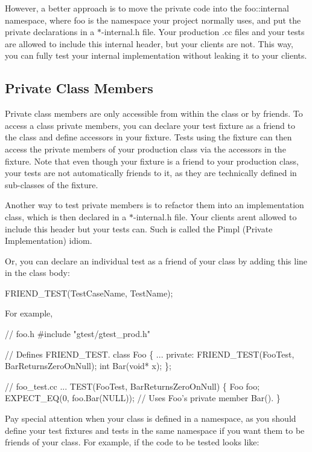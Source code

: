 However, a better approach is to move the private code into the {\ttfamily foo\+::internal} namespace, where {\ttfamily foo} is the namespace your project normally uses, and put the private declarations in a {\ttfamily $\ast$-\/internal.h} file. Your production {\ttfamily .cc} files and your tests are allowed to include this internal header, but your clients are not. This way, you can fully test your internal implementation without leaking it to your clients.

\subsection*{Private Class Members}

Private class members are only accessible from within the class or by friends. To access a class\textquotesingle{} private members, you can declare your test fixture as a friend to the class and define accessors in your fixture. Tests using the fixture can then access the private members of your production class via the accessors in the fixture. Note that even though your fixture is a friend to your production class, your tests are not automatically friends to it, as they are technically defined in sub-\/classes of the fixture.

Another way to test private members is to refactor them into an implementation class, which is then declared in a {\ttfamily $\ast$-\/internal.h} file. Your clients aren\textquotesingle{}t allowed to include this header but your tests can. Such is called the Pimpl (Private Implementation) idiom.

Or, you can declare an individual test as a friend of your class by adding this line in the class body\+:


\begin{DoxyCode}
FRIEND\_TEST(TestCaseName, TestName);
\end{DoxyCode}


For example, 
\begin{DoxyCode}
// foo.h
#include "gtest/gtest\_prod.h"

// Defines FRIEND\_TEST.
class Foo \{
  ...
 private:
  FRIEND\_TEST(FooTest, BarReturnsZeroOnNull);
  int Bar(void* x);
\};

// foo\_test.cc
...
TEST(FooTest, BarReturnsZeroOnNull) \{
  Foo foo;
  EXPECT\_EQ(0, foo.Bar(NULL));
  // Uses Foo's private member Bar().
\}
\end{DoxyCode}


Pay special attention when your class is defined in a namespace, as you should define your test fixtures and tests in the same namespace if you want them to be friends of your class. For example, if the code to be tested looks like\+:


